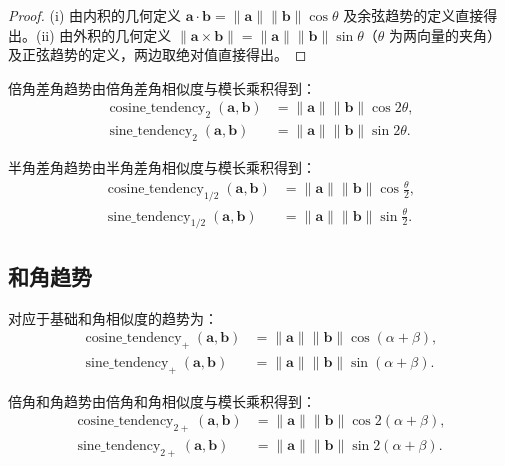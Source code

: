 \begin{proof}
(i) 由内积的几何定义 $\mathbf{a} \cdot \mathbf{b} = \|\mathbf{a}\| \|\mathbf{b}\| \cos\theta$ 及余弦趋势的定义直接得出。(ii) 由外积的几何定义 $\|\mathbf{a} \times \mathbf{b}\| = \|\mathbf{a}\| \|\mathbf{b}\| \sin\theta$（$\theta$ 为两向量的夹角）及正弦趋势的定义，两边取绝对值直接得出。
\end{proof}

\begin{definition}[倍角差角趋势]\label{def:double_diff_tendency}
倍角差角趋势由倍角差角相似度与模长乘积得到：
\begin{align*}
\operatorname{cosine\_tendency}_2(\mathbf{a}, \mathbf{b}) &= \|\mathbf{a}\| \|\mathbf{b}\| \cos 2\theta, \\
\operatorname{sine\_tendency}_2(\mathbf{a}, \mathbf{b}) &= \|\mathbf{a}\| \|\mathbf{b}\| \sin 2\theta.
\end{align*}
\end{definition}

\begin{definition}[半角差角趋势]\label{def:half_diff_tendency}
半角差角趋势由半角差角相似度与模长乘积得到：
\begin{align*}
\operatorname{cosine\_tendency}_{1/2}(\mathbf{a}, \mathbf{b}) &= \|\mathbf{a}\| \|\mathbf{b}\| \cos\frac{\theta}{2}, \\
\operatorname{sine\_tendency}_{1/2}(\mathbf{a}, \mathbf{b}) &= \|\mathbf{a}\| \|\mathbf{b}\| \sin\frac{\theta}{2}.
\end{align*}
\end{definition}

\subsection{\texorpdfstring{和角趋势}{和角趋势}}

\begin{definition}[基础和角趋势]\label{def:basic_sum_tendency}
对应于基础和角相似度的趋势为：
\begin{align*}
\operatorname{cosine\_tendency}_+(\mathbf{a}, \mathbf{b}) &= \|\mathbf{a}\| \|\mathbf{b}\| \cos(\alpha + \beta), \\
\operatorname{sine\_tendency}_+(\mathbf{a}, \mathbf{b}) &= \|\mathbf{a}\| \|\mathbf{b}\| \sin(\alpha + \beta).
\end{align*}
\end{definition}

\begin{definition}[倍角和角趋势]\label{def:double_sum_tendency}
倍角和角趋势由倍角和角相似度与模长乘积得到：
\begin{align*}
\operatorname{cosine\_tendency}_{2+}(\mathbf{a}, \mathbf{b}) &= \|\mathbf{a}\| \|\mathbf{b}\| \cos 2(\alpha + \beta), \\
\operatorname{sine\_tendency}_{2+}(\mathbf{a}, \mathbf{b}) &= \|\mathbf{a}\| \|\mathbf{b}\| \sin 2(\alpha + \beta).
\end{align*}
\end{definition}

